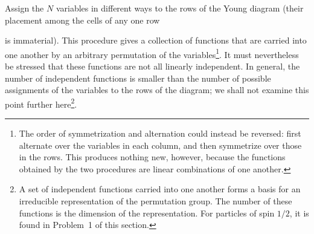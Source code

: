 Assign the $N$ variables in different ways to the rows of the Young diagram (their placement among the cells of any one row

is immaterial). This procedure gives a collection of functions that are carried into one another by an arbitrary permutation of the variables\footnote{The order of symmetrization and alternation could instead be reversed: first alternate over the variables in each column, and then symmetrize over those in the rows. This produces nothing new, however, because the functions obtained by the two procedures are linear combinations of one another.}. It must nevertheless be stressed that these functions are not all linearly independent. In general, the number of independent functions is smaller than the number of possible assignments of the variables to the rows of the diagram; we shall not examine this point further here\footnote{A set of independent functions carried into one another forms a basis for an irreducible representation of the permutation group. The number of these functions is the dimension of the representation. For particles of spin $1/2$, it is found in Problem~1 of this section.}.
